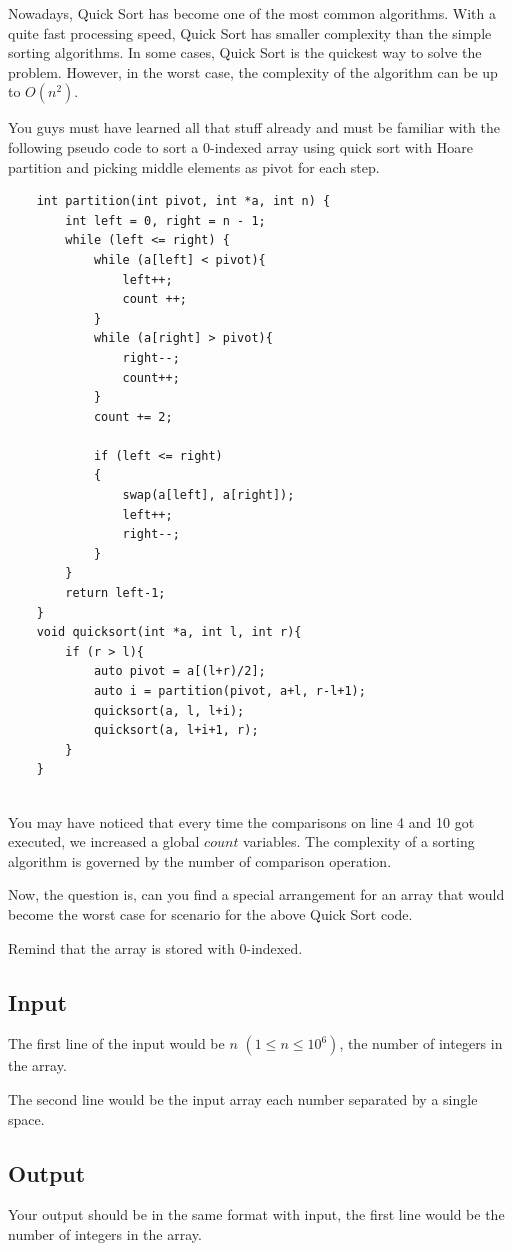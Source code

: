\documentclass[12pt]{article}
\begin{document}
    Nowadays, Quick Sort has become one of the most common algorithms. With a quite fast processing speed, Quick Sort has smaller complexity than the simple sorting algorithms. In some cases, Quick Sort is the quickest way to solve the problem. However, in the worst case, the complexity of the algorithm can be up to $O(n^2)$.
    
    You guys must have learned all that stuff already and must be familiar with the following pseudo code to sort a $0$-indexed array using quick sort with Hoare partition and picking middle elements as pivot for each step.
    \begin{lstlisting}
    int partition(int pivot, int *a, int n) {
    	int left = 0, right = n - 1;
    	while (left <= right) {
    		while (a[left] < pivot){
                left++;
                count ++;
    		}
    		while (a[right] > pivot){
                right--;
                count++;
    		}
    		count += 2;
    
    		if (left <= right)
    	 	{
    		 	swap(a[left], a[right]);
    		 	left++;
    		 	right--;
    		}
    	}
    	return left-1;
    }
    void quicksort(int *a, int l, int r){
        if (r > l){
            auto pivot = a[(l+r)/2];
            auto i = partition(pivot, a+l, r-l+1);
            quicksort(a, l, l+i);
            quicksort(a, l+i+1, r);
        }
    }
    
    \end{lstlisting}		
    
    You may have noticed that every time the comparisons on line 4 and 10 got executed, we increased a global $count$ variables. The complexity of a sorting algorithm is governed by the number of comparison operation. 
    
    Now, the question is, can you find a special arrangement for an array that would become the worst case for scenario for the above Quick Sort code.
    
    Remind that the array is stored with $0$-indexed.
    
    \subsection*{Input}
    The first line of the input would be $n$ $(1 \le n \le 10^6)$, the number of integers in the array.
    
    The second line would be the input array each number separated by a single space.
    \subsection*{Output}
    Your output should be in the same format with input, the first line would be the number of integers in the array.
    
\end{document}
